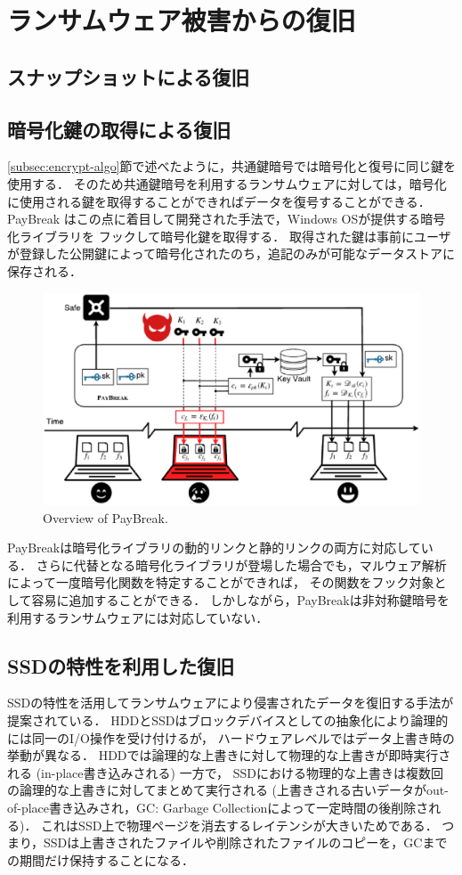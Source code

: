\section{ランサムウェア被害からの復旧}
\subsection{スナップショットによる復旧}
\subsection{暗号化鍵の取得による復旧}
\ref{subsec:encrypt-algo}節で述べたように，共通鍵暗号では暗号化と復号に同じ鍵を使用する．
そのため共通鍵暗号を利用するランサムウェアに対しては，暗号化に使用される鍵を取得することができればデータを復号することができる．
PayBreak \cite{kolodenker2017paybreak} はこの点に着目して開発された手法で，Windows OSが提供する暗号化ライブラリを
フックして暗号化鍵を取得する．
取得された鍵は事前にユーザが登録した公開鍵によって暗号化されたのち，追記のみが可能なデータストアに保存される．
\begin{figure}[t]
  \begin{center}
    \includegraphics[width=0.8\columnwidth]{doc/img/paybreak-overview.eps}
  \end{center}
  \caption{Overview of PayBreak. \cite{kolodenker2017paybreak}}
  \label{fig:paybreak-overview}
\end{figure}
PayBreakは暗号化ライブラリの動的リンクと静的リンクの両方に対応している．
さらに代替となる暗号化ライブラリが登場した場合でも，マルウェア解析によって一度暗号化関数を特定することができれば，
その関数をフック対象として容易に追加することができる．
しかしながら，PayBreakは非対称鍵暗号を利用するランサムウェアには対応していない．

\subsection{SSDの特性を利用した復旧}
SSDの特性を活用してランサムウェアにより侵害されたデータを復旧する手法が提案されている．
HDDとSSDはブロックデバイスとしての抽象化により論理的には同一のI/O操作を受け付けるが，
ハードウェアレベルではデータ上書き時の挙動が異なる．
HDDでは論理的な上書きに対して物理的な上書きが即時実行される (in-place書き込みされる) 一方で，
SSDにおける物理的な上書きは複数回の論理的な上書きに対してまとめて実行される
(上書きされる古いデータがout-of-place書き込みされ，GC: Garbage Collectionによって一定時間の後削除される)．
これはSSD上で物理ページを消去するレイテンシが大きいためである．
つまり，SSDは上書きされたファイルや削除されたファイルのコピーを，GCまでの期間だけ保持することになる．

